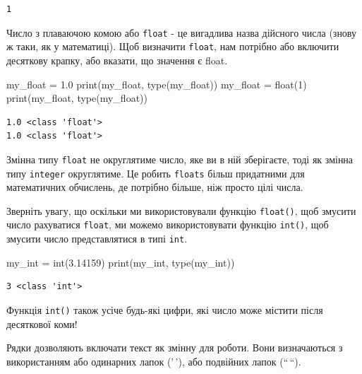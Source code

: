 \documentclass[
  letterpaper,
]{report}
\newenvironment{Shaded}{\begin{snugshade}}{\end{snugshade}}
\newcommand{\BuiltInTok}[1]{\textcolor[rgb]{0.00,0.23,0.31}{#1}}
\newcommand{\DecValTok}[1]{\textcolor[rgb]{0.68,0.00,0.00}{#1}}
\newcommand{\FloatTok}[1]{\textcolor[rgb]{0.68,0.00,0.00}{#1}}
\newcommand{\NormalTok}[1]{\textcolor[rgb]{0.00,0.23,0.31}{#1}}
\newcommand{\OperatorTok}[1]{\textcolor[rgb]{0.37,0.37,0.37}{#1}}
\begin{document}
\begin{verbatim}
1
\end{verbatim}

Число з плаваючою комою або \texttt{float} - це вигадлива назва дійсного
числа (знову ж таки, як у математиці). Щоб визначити \texttt{float}, нам
потрібно або включити десяткову крапку, або вказати, що значення є
float.

\begin{Shaded}
\begin{Highlighting}[]
\NormalTok{my\_float }\OperatorTok{=} \FloatTok{1.0}
\BuiltInTok{print}\NormalTok{(my\_float, }\BuiltInTok{type}\NormalTok{(my\_float))}
\NormalTok{my\_float }\OperatorTok{=} \BuiltInTok{float}\NormalTok{(}\DecValTok{1}\NormalTok{)}
\BuiltInTok{print}\NormalTok{(my\_float, }\BuiltInTok{type}\NormalTok{(my\_float))}
\end{Highlighting}
\end{Shaded}

\begin{verbatim}
1.0 <class 'float'>
1.0 <class 'float'>
\end{verbatim}

Змінна типу \texttt{float} не округлятиме число, яке ви в ній
зберігаєте, тоді як змінна типу \texttt{integer} округлятиме. Це робить
\texttt{floats} більш придатними для математичних обчислень, де потрібно
більше, ніж просто цілі числа.

Зверніть увагу, що оскільки ми використовували функцію \texttt{float()},
щоб змусити число рахуватися \texttt{float}, ми можемо використовувати
функцію \texttt{int()}, щоб змусити число представлятися в типі
\texttt{int}.

\begin{Shaded}
\begin{Highlighting}[]
\NormalTok{my\_int }\OperatorTok{=} \BuiltInTok{int}\NormalTok{(}\FloatTok{3.14159}\NormalTok{)}
\BuiltInTok{print}\NormalTok{(my\_int, }\BuiltInTok{type}\NormalTok{(my\_int))}
\end{Highlighting}
\end{Shaded}

\begin{verbatim}
3 <class 'int'>
\end{verbatim}

Функція \texttt{int()} також усіче будь-які цифри, які число може
містити після десяткової коми!

Рядки дозволяють включати текст як змінну для роботи. Вони визначаються
з використанням або одинарних лапок ('\,'), або подвійних лапок
(``\,``).
\end{document}
